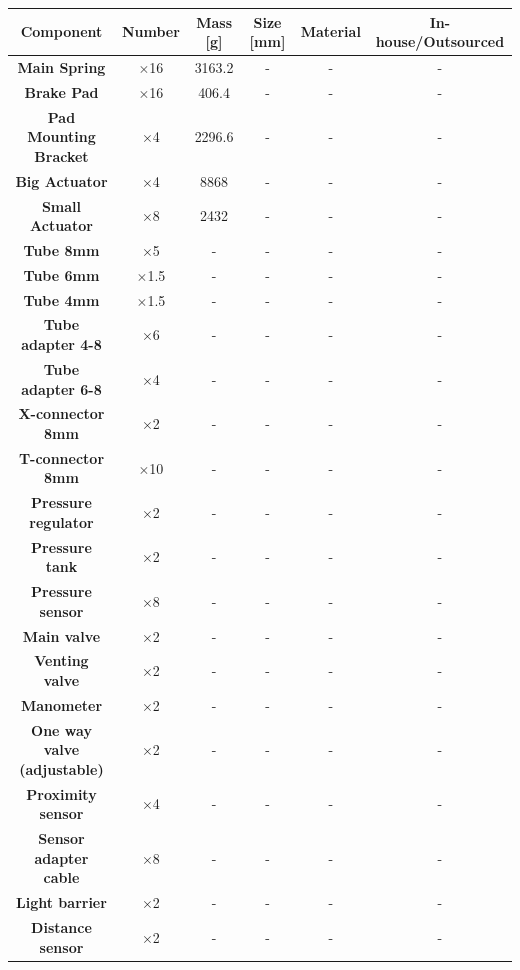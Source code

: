 \begin{table}[htbp]
\centering
\begin{adjustbox}{width=\textwidth} %
\begin{tabular}{|c|c|c|c|c|c|}
\hline
\textbf{Component} & \textbf{Number} & \textbf{Mass [g]} & \textbf{Size [mm]} & \textbf{Material} & \textbf{In-house/Outsourced} \\
\hline
\textbf{Main Spring} & $\times$16 & 3163.2 & - & - & - \\
\textbf{Brake Pad} &$\times$16 & 406.4 & - & - & - \\
\textbf{Pad Mounting Bracket} & $\times$4 & 2296.6 & - & - & - \\
\textbf{Big Actuator} & $\times$4 & 8868 & - & - & - \\
\textbf{Small Actuator} &$\times$8 & 2432 & - & - & - \\
\textbf{Tube 8mm} & $\times$5 & - & - & - & - \\
\textbf{Tube 6mm} &  $\times$1.5 & - & - & - & - \\
\textbf{Tube 4mm} &  $\times$1.5 & - & - & - & - \\
\textbf{Tube adapter 4-8} &$\times$6 & - & - & - & - \\
\textbf{Tube adapter 6-8} & $\times$4 & - & - & - & - \\
\textbf{X-connector 8mm} &$\times$2 & - & - & - & - \\
\textbf{T-connector 8mm} & $\times$10 & - & - & - & - \\
\textbf{Pressure regulator} &$\times$2 & - & - & - & - \\
\textbf{Pressure tank} &$\times$2 & - & - & - & - \\
\textbf{Pressure sensor} & $\times$8 & - & - & - & - \\
\textbf{Main valve} &$\times$2 & - & - & - & - \\
\textbf{Venting valve} &$\times$2 & - & - & - & - \\
\textbf{Manometer} & $\times$2 & - & - & - & - \\
\textbf{One way valve (adjustable)} &$\times$2 & - & - & - & - \\
\textbf{Proximity sensor} & $\times$4 & - & - & - & - \\
\textbf{Sensor adapter cable} &$\times$8 & - & - & - & - \\
\textbf{Light barrier} & $\times$2 & - & - & - & - \\
\textbf{Distance sensor} & $\times$2 & - & - & - & - \\

\end{tabular}
\end{adjustbox}
\end{table}
